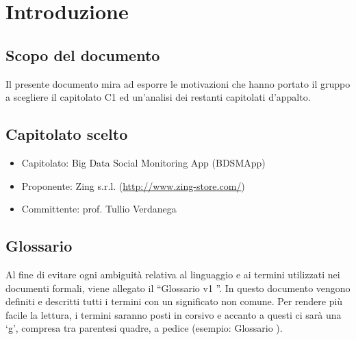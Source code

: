%


\section{Introduzione}

\subsection{Scopo del documento}
Il presente documento mira ad esporre le motivazioni che hanno portato il gruppo a scegliere il capitolato C1 ed un'analisi dei restanti capitolati d'appalto.

\subsection{Capitolato scelto}
\begin{itemize}
\item Capitolato: Big Data Social Monitoring App (BDSMApp)
\item Proponente: Zing s.r.l. (\url{http://www.zing-store.com/})
\item Committente: prof. Tullio Verdanega
\end{itemize}

\subsection{Glossario}
Al fine di evitare ogni ambiguità relativa al linguaggio e ai termini utilizzati nei documenti formali, viene allegato il “Glossario v1 ”. In questo documento vengono definiti e descritti tutti i termini con un significato non comune. Per rendere più facile la lettura, i termini saranno posti in corsivo e accanto a questi ci sarà una ‘g’, compresa tra
parentesi quadre, a pedice (esempio: Glossario \ped{[g]}).

